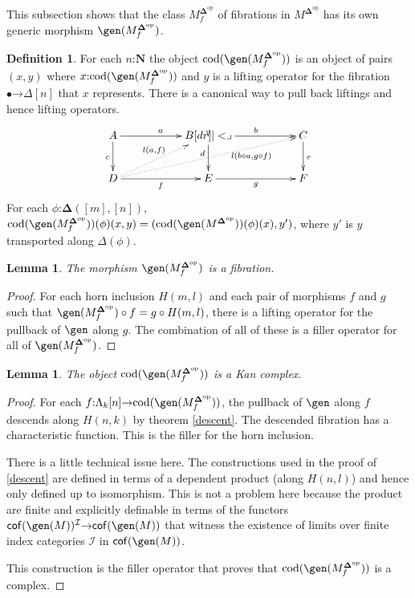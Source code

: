 \documentclass{amsart}
\theoremstyle{plain}
\newtheorem{lemma}[theorem]{Lemma}
\theoremstyle{definition}
\newtheorem{defin}[theorem]{Definition}
\newcommand\cat\mathcal
\newcommand\cod{\mathrm{cod}}
\newcommand\nno{\mathbf N}
\newcommand\dual{^{\mathrm{op}}}
\newcommand\simCat{\mathbf\Delta}
\newcommand\s{^{\simCat\dual}}
\newcommand\of{\mathord:}
\renewcommand\to{\mathord\rightarrow}
\newcommand\simplex\Delta
\newcommand\horn\Lambda
\newcommand\f{_f}
\begin{document}
This subsection shows that the class $M\s\f$ of fibrations in $M\s$ has its own generic morphism $\gen(M\s\f)$.

\begin{defin}
For each $n\of\nno$ the object $\cod(\gen(M\s\f))$ is an object of pairs $(x,y)$ where $x\of \cod(\gen(M\s\f))$ and $y$ is a lifting operator for the fibration $\bullet\to\simplex[n]$ that $x$ represents. There is a canonical way to pull back liftings and hence lifting operators.
\[\xymatrix{
A\ar[rr]^a\ar[d]_c && B \ar[rr]^b\ar[d]_(.4)d\pb && C\ar[d]^e\\
D\ar[rr]_f \ar@{.>}[urrrr]_(.7){l(b\circ a, g\circ f)}\ar@{.>}[urr]^{l(a, f)} && E \ar[rr]_g && F
}\]
For each $\phi\of \simCat([m],[n])$, $\cod(\gen(M\s\f))(\phi)(x,y) = (\cod(\gen(M\s))(\phi)(x),y')$, where $y'$ is $y$ transported along $\simplex(\phi)$.
\end{defin}


\begin{lemma} The morphism $\gen(M\s\f)$ is a fibration. \end{lemma}

\begin{proof} For each horn inclusion $H(m,l)$ and each pair of morphisms $f$ and $g$ such that $\gen(M\s\f)\circ f=g\circ H(m,l)$, there is a lifting operator for the pullback of $\gen$ along $g$. The combination of all of these is a filler operator for all of $\gen(M\s\f)$.
\end{proof}


\begin{lemma} The object $\cod(\gen(M\s\f))$ is a Kan complex. \end{lemma}

\begin{proof} For each $f\of\horn_k[n]\to \cod(\gen(M\s\f))$, the pullback of $\gen$ along $f$ descends along $H(n,k)$ by theorem \ref{descent}. The descended fibration has a characteristic function. This is the filler for the horn inclusion. %

There is a little technical issue here. The constructions used in the proof of \ref{descent} are defined in terms of a dependent product (along $H(n,l)$) and hence only defined up to isomorphism. This is not a problem here because the product are finite and explicitly definable in terms of the functors $\cof(\gen(M))^\cat I \to \cof(\gen(M))$ that witness the existence of limits over finite index categories $\cat I$ in $\cof(\gen(M))$.

This construction is the filler operator that proves that $\cod(\gen(M\s\f))$ is a complex.
\end{proof}
\end{document}
